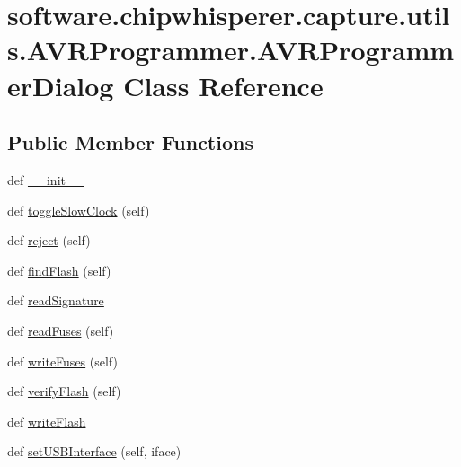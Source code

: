 \hypertarget{classsoftware_1_1chipwhisperer_1_1capture_1_1utils_1_1AVRProgrammer_1_1AVRProgrammerDialog}{}\section{software.\+chipwhisperer.\+capture.\+utils.\+A\+V\+R\+Programmer.\+A\+V\+R\+Programmer\+Dialog Class Reference}
\label{classsoftware_1_1chipwhisperer_1_1capture_1_1utils_1_1AVRProgrammer_1_1AVRProgrammerDialog}
\subsection*{Public Member Functions}
\begin{DoxyCompactItemize}
\item 
def \hyperlink{classsoftware_1_1chipwhisperer_1_1capture_1_1utils_1_1AVRProgrammer_1_1AVRProgrammerDialog_a48eb63becd4d58e99b4bc6b82e4aa34b}{\+\_\+\+\_\+init\+\_\+\+\_\+}
\item 
def \hyperlink{classsoftware_1_1chipwhisperer_1_1capture_1_1utils_1_1AVRProgrammer_1_1AVRProgrammerDialog_a60308672ffe905b679cbdb069c9b62ac}{toggle\+Slow\+Clock} (self)
\item 
def \hyperlink{classsoftware_1_1chipwhisperer_1_1capture_1_1utils_1_1AVRProgrammer_1_1AVRProgrammerDialog_afea9b51c293660a181fe3bb43a442535}{reject} (self)
\item 
def \hyperlink{classsoftware_1_1chipwhisperer_1_1capture_1_1utils_1_1AVRProgrammer_1_1AVRProgrammerDialog_a13649fab2f84a7e156d01215dca6023a}{find\+Flash} (self)
\item 
def \hyperlink{classsoftware_1_1chipwhisperer_1_1capture_1_1utils_1_1AVRProgrammer_1_1AVRProgrammerDialog_a11c0e89fab704a4a55dda4d5044ca904}{read\+Signature}
\item 
def \hyperlink{classsoftware_1_1chipwhisperer_1_1capture_1_1utils_1_1AVRProgrammer_1_1AVRProgrammerDialog_a8abfb6eb07a499e177964da8765b7ba4}{read\+Fuses} (self)
\item 
def \hyperlink{classsoftware_1_1chipwhisperer_1_1capture_1_1utils_1_1AVRProgrammer_1_1AVRProgrammerDialog_aa93740973dbf489a94084037117799f6}{write\+Fuses} (self)
\item 
def \hyperlink{classsoftware_1_1chipwhisperer_1_1capture_1_1utils_1_1AVRProgrammer_1_1AVRProgrammerDialog_ac44c91ef718b5f1841eb5ddd436e2f47}{verify\+Flash} (self)
\item 
def \hyperlink{classsoftware_1_1chipwhisperer_1_1capture_1_1utils_1_1AVRProgrammer_1_1AVRProgrammerDialog_a3087c0497e148b698db83694ddf3651c}{write\+Flash}
\item 
def \hyperlink{classsoftware_1_1chipwhisperer_1_1capture_1_1utils_1_1AVRProgrammer_1_1AVRProgrammerDialog_a2ff20b3bf6e219b5e2f6ceb95e6202dc}{set\+U\+S\+B\+Interface} (self, iface)
\end{DoxyCompactItemize}
